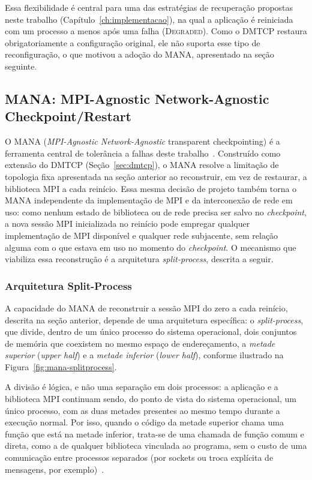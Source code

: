 Essa flexibilidade é central para uma das estratégias de recuperação propostas neste
trabalho (Capítulo~\ref{ch:implementacao}), na qual a aplicação é reiniciada com um
processo a menos após uma falha (\textsc{Degraded}). Como o DMTCP restaura
obrigatoriamente a configuração original, ele não suporta esse tipo de
reconfiguração, o que motivou a adoção do MANA, apresentado na seção seguinte.

\subsection{MANA: MPI-Agnostic Network-Agnostic Checkpoint/Restart}
\label{sec:mana}

O MANA (\textit{MPI-Agnostic Network-Agnostic} transparent checkpointing) é a
ferramenta central de tolerância a falhas deste trabalho~\cite{garg2019mana}.
Construído como extensão do DMTCP (Seção~\ref{sec:dmtcp}), o MANA resolve a limitação
de topologia fixa apresentada na seção anterior ao reconstruir, em vez de restaurar, a
biblioteca MPI a cada reinício. Essa mesma decisão de projeto também torna o MANA
independente da implementação de MPI e da interconexão de rede em uso: como nenhum
estado de biblioteca ou de rede precisa ser salvo no \textit{checkpoint}, a nova sessão MPI
inicializada no reinício pode empregar qualquer implementação de MPI disponível e
qualquer rede subjacente, sem relação alguma com o que estava em uso no momento do
\textit{checkpoint}. O mecanismo que viabiliza essa reconstrução é a arquitetura
\textit{split-process}, descrita a seguir.

\subsubsection{Arquitetura Split-Process}
\label{sec:mana-splitprocess}

A capacidade do MANA de reconstruir a sessão MPI do zero a cada reinício, descrita na
seção anterior, depende de uma arquitetura específica: o \textit{split-process}, que
divide, dentro de um único processo do sistema operacional, dois conjuntos de memória
que coexistem no mesmo espaço de endereçamento, a \textit{metade superior}
(\textit{upper half}) e a \textit{metade inferior} (\textit{lower half}), conforme
ilustrado na Figura~\ref{fig:mana-splitprocess}.

A divisão é lógica, e não uma separação em dois processos: a aplicação e a biblioteca
MPI continuam sendo, do ponto de vista do sistema operacional, um único processo, com
as duas metades presentes ao mesmo tempo durante a execução normal. Por isso, quando o
código da metade superior chama uma função que está na metade inferior, trata-se de
uma chamada de função comum e direta, como a de qualquer biblioteca vinculada ao
programa, sem o custo de uma comunicação entre processos separados (por sockets ou
troca explícita de mensagens, por exemplo)~\cite{garg2019mana}.

